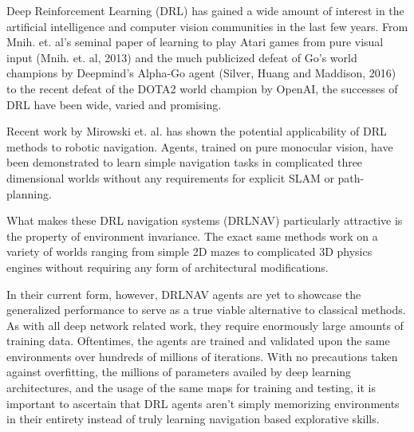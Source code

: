 
Deep Reinforcement Learning (DRL) has gained a wide amount of interest in the artificial intelligence and computer vision communities in the last few years.
From Mnih. et. al's seminal paper of learning to play Atari games from pure visual input (Mnih. et. al, 2013) and the much publicized defeat of Go's world champions by Deepmind's Alpha-Go agent (Silver, Huang and Maddison, 2016) to the recent defeat of the DOTA2 world champion by OpenAI, the successes of DRL have been wide, varied and promising. 

Recent work by Mirowski et. al. has shown the potential applicability of DRL methods to robotic navigation. Agents, trained on pure monocular vision, have been demonstrated to learn simple navigation tasks in complicated three dimensional worlds without any requirements for explicit SLAM or path-planning. 
 
What makes these DRL navigation systems (DRLNAV) particularly attractive is the property of environment invariance. The exact same methods work on a variety of worlds ranging from simple 2D mazes to complicated 3D physics engines without requiring any form of architectural modifications.

In their current form, however, DRLNAV agents are yet to showcase the generalized performance to serve as a true viable alternative to classical methods. As with all deep network related work, they require enormously large amounts of training data. Oftentimes, the agents are trained and validated upon the same environments over hundreds of millions of iterations. With no precautions taken against overfitting, the millions of parameters availed by deep learning architectures, and the usage of the same maps for training and testing, it is important to ascertain that DRL agents aren't simply memorizing environments in their entirety instead of truly learning navigation based explorative skills.
 
